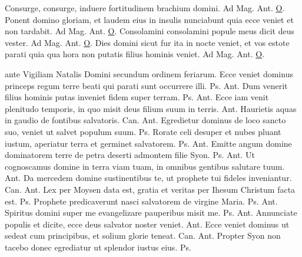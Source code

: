 \begin{multicols*}{2}
 Consurge, consurge, induere fortitudinem brachium domini. {\color{Red} Ad Mag. Ant.} \hyperlink{o-antiphons}{O}.
 Ponent domino gloriam, et laudem eius in insulis nunciabunt quia ecce veniet et non tardabit. {\color{Red} Ad Mag. Ant.} \hyperlink{o-antiphons}{O}.
 Consolamini consolamini popule meus dicit deus vester. {\color{Red} Ad Mag. Ant.} \hyperlink{o-antiphons}{O}.
 Dies domini sicut fur ita in nocte veniet, et vos estote parati quia qua hora non putatis filius hominis veniet. {\color{Red} Ad Mag. Ant.} \hyperlink{o-antiphons}{O}.
{\color{Red} }
\par \noindent ante Vigiliam Natalis Domini secundum ordinem feriarum.
 Ecce veniet dominus princeps regum terre beati qui parati sunt occurrere illi. {\color{Red} Ps.}  {\color{Red} Ant.} Dum venerit filius hominis putas inveniet fidem super terram. {\color{Red} Ps.}  {\color{Red} Ant.} Ecce iam venit plenitudo temporis, in quo misit deus filium suum in terris.  {\color{Red} Ant.} Haurietis aquas in gaudio de fontibus salvatoris. {\color{Red} Can.}  {\color{Red} Ant.} Egredietur dominus de loco sancto suo, veniet ut salvet populum suum. {\color{Red} Ps.} 
 Rorate celi desuper et nubes pluant iustum, aperiatur terra et germinet salvatorem. {\color{Red} Ps.}  {\color{Red} Ant.} Emitte angum domine dominatorem terre de petra deserti admontem filie Syon. {\color{Red} Ps.}  {\color{Red} Ant.} Ut cognoscamus domine in terra viam tuam, in omnibus gentibus salutare tuum.  {\color{Red} Ant.} Da mercedem domine sustinentibus te, ut prophete tui fideles inveniantur. {\color{Red} Can.}  {\color{Red} Ant.} Lex per Moysen data est, gratia et veritas per Ihesum Christum facta est. {\color{Red} Ps.} 
 Prophete predicaverunt nasci salvatorem de virgine Maria. {\color{Red} Ps.}  {\color{Red} Ant.} Spiritus domini super me evangelizare pauperibus misit me. {\color{Red} Ps.}  {\color{Red} Ant.} Annunciate populis et dicite, ecce deus salvator noster veniet.  {\color{Red} Ant.} Ecce veniet dominus ut sedeat cum principibus, et solium glorie teneat. {\color{Red} Can.}  {\color{Red} Ant.} Propter Syon non tacebo donec egrediatur ut splendor iustus eius. {\color{Red} Ps.} 

\end{multicols*}
